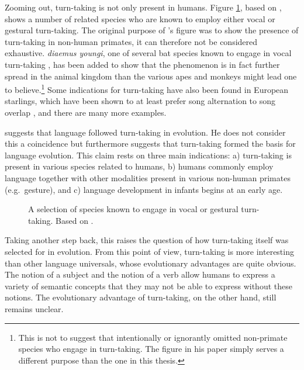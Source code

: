 Zooming out, turn-taking is not only present in humans.
Figure \ref{fig:species}, based on \citet[, ]{levinson_turn-taking_2016}, shows a number of related species who are known to employ either vocal or gestural turn-taking.
The original purpose of \citeauthor{levinson_turn-taking_2016}'s figure was to show the presence of turn-taking in non-human primates, it can therefore not be considered exhaustive.
\emph{diaemus youngi}, one of several bat species known to engage in vocal turn-taking \citep[]{vernes_what_2017}, has been added to show that the phenomenon is in fact further spread in the animal kingdom than the various apes and monkeys might lead one to believe.\footnote{This is not to suggest that \citeauthor{levinson_turn-taking_2016} intentionally or ignorantly omitted non-primate species who engage in turn-taking. The figure in his paper simply serves a different purpose than the one in this thesis.}
Some indications for turn-taking have also been found in European starlings, which have been shown to at least prefer song alternation to song overlap \citep{henry_social_2015}, and there are many more examples.

\citet[]{levinson_turn-taking_2016} suggests that language followed turn-taking in evolution. He does not consider this a coincidence but furthermore suggests that turn-taking formed the basis for language evolution.
This claim rests on three main indications: a) turn-taking is present in various species related to humans, b) humans commonly employ language together with other modalities present in various non-human primates (e.g.~gesture), and c) language development in infants begins at an early age.

\begin{figure}
	\centering
	
	\caption[Species known to engage in vocal or gestural turn-taking.]{A selection of species known to engage in vocal or gestural turn-taking. Based on \citet[, ]{levinson_turn-taking_2016}.}
	\label{fig:species}
\end{figure}

Taking another step back, this raises the question of how turn-taking itself was selected for in evolution.
From this point of view, turn-taking is more interesting than other language universals, whose evolutionary advantages are quite obvious.
The notion of a subject and the notion of a verb \citep[both considered language universals,][]{robins_noun_1952,hopper_iconicity_1985} allow humans to express a variety of semantic concepts that they may not be able to express without these notions.
The evolutionary advantage of turn-taking, on the other hand, still remains unclear.

